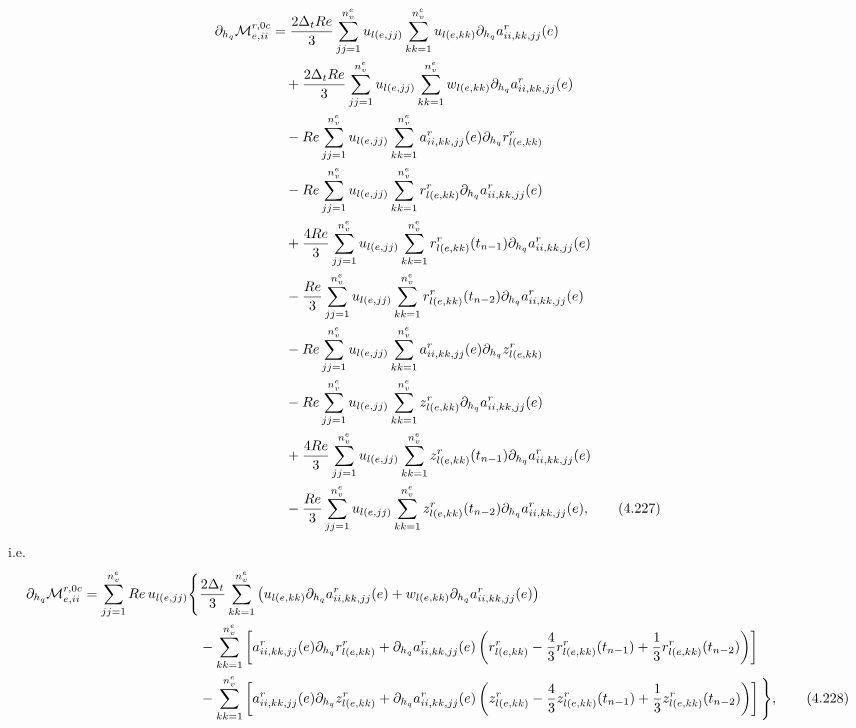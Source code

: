 \documentclass{article}
\begin{document}
\begin{align}
\partial_{h_q}\mathcal{M}_{e,ii}^{r,0c} &= \frac{2\Delta_t Re}{3} \sum_{jj=1}^{n_v^e} u_{l(e,jj)} \sum_{kk=1}^{n_v^e} u_{l(e,kk)} \partial_{h_q} a_{ii,kk,jj}^r(e) \nonumber\\
&\quad + \frac{2\Delta_t Re}{3} \sum_{jj=1}^{n_v^e} u_{l(e,jj)} \sum_{kk=1}^{n_v^e} w_{l(e,kk)} \partial_{h_q} a_{ii,kk,jj}^r(e) \nonumber\\
&\quad - Re \sum_{jj=1}^{n_v^e} u_{l(e,jj)} \sum_{kk=1}^{n_v^e} a_{ii,kk,jj}^r(e) \partial_{h_q} r_{l(e,kk)}^r \nonumber\\
&\quad - Re \sum_{jj=1}^{n_v^e} u_{l(e,jj)} \sum_{kk=1}^{n_v^e} r_{l(e,kk)}^r \partial_{h_q} a_{ii,kk,jj}^r(e) \nonumber\\
&\quad + \frac{4Re}{3} \sum_{jj=1}^{n_v^e} u_{l(e,jj)} \sum_{kk=1}^{n_v^e} r_{l(e,kk)}^r(t_{n-1}) \partial_{h_q} a_{ii,kk,jj}^r(e) \nonumber\\
&\quad - \frac{Re}{3} \sum_{jj=1}^{n_v^e} u_{l(e,jj)} \sum_{kk=1}^{n_v^e} r_{l(e,kk)}^r(t_{n-2}) \partial_{h_q} a_{ii,kk,jj}^r(e) \nonumber\\
&\quad - Re \sum_{jj=1}^{n_v^e} u_{l(e,jj)} \sum_{kk=1}^{n_v^e} a_{ii,kk,jj}^r(e) \partial_{h_q} z_{l(e,kk)}^r \nonumber\\
&\quad - Re \sum_{jj=1}^{n_v^e} u_{l(e,jj)} \sum_{kk=1}^{n_v^e} z_{l(e,kk)}^r \partial_{h_q} a_{ii,kk,jj}^r(e) \nonumber\\
&\quad + \frac{4Re}{3} \sum_{jj=1}^{n_v^e} u_{l(e,jj)} \sum_{kk=1}^{n_v^e} z_{l(e,kk)}^r(t_{n-1}) \partial_{h_q} a_{ii,kk,jj}^r(e) \nonumber\\
&\quad - \frac{Re}{3} \sum_{jj=1}^{n_v^e} u_{l(e,jj)} \sum_{kk=1}^{n_v^e} z_{l(e,kk)}^r(t_{n-2}) \partial_{h_q} a_{ii,kk,jj}^r(e), \tag{4.227}
\end{align}
i.e.
\begin{align}
\partial_{h_q}\mathcal{M}_{e,ii}^{r,0c} = \sum_{jj=1}^{n_v^e} Re\, u_{l(e,jj)} \Bigg\{ &\frac{2\Delta_t}{3} \sum_{kk=1}^{n_v^e} \left( u_{l(e,kk)} \partial_{h_q} a_{ii,kk,jj}^r(e) + w_{l(e,kk)} \partial_{h_q} a_{ii,kk,jj}^r(e) \right) \nonumber\\
&- \sum_{kk=1}^{n_v^e} \left[ a_{ii,kk,jj}^r(e) \partial_{h_q} r_{l(e,kk)}^r + \partial_{h_q} a_{ii,kk,jj}^r(e) \left( r_{l(e,kk)}^r - \frac{4}{3} r_{l(e,kk)}^r(t_{n-1}) + \frac{1}{3} r_{l(e,kk)}^r(t_{n-2}) \right) \right] \nonumber\\
&- \sum_{kk=1}^{n_v^e} \left[ a_{ii,kk,jj}^r(e) \partial_{h_q} z_{l(e,kk)}^r + \partial_{h_q} a_{ii,kk,jj}^r(e) \left( z_{l(e,kk)}^r - \frac{4}{3} z_{l(e,kk)}^r(t_{n-1}) + \frac{1}{3} z_{l(e,kk)}^r(t_{n-2}) \right) \right] \Bigg\}, \tag{4.228}
\end{align}
\end{document}
